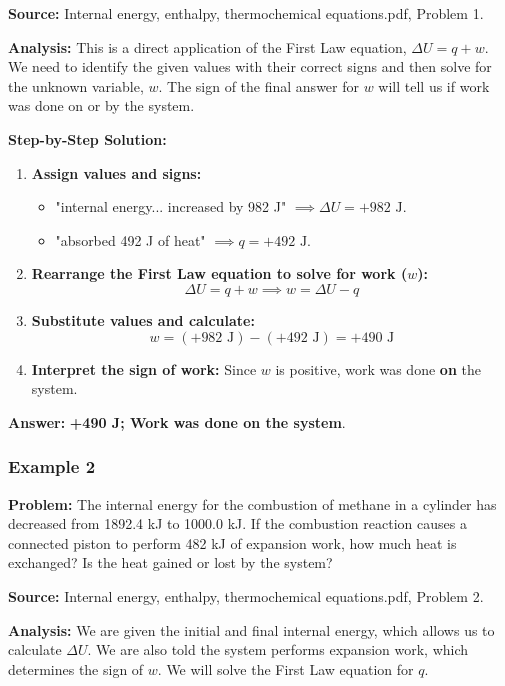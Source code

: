 \documentclass{article}
\begin{document}
\textbf{Source:} Internal energy, enthalpy, thermochemical equations.pdf, Problem 1.

\textbf{Analysis:} This is a direct application of the First Law equation, $\Delta U = q + w$. We need to identify the given values with their correct signs and then solve for the unknown variable, $w$. The sign of the final answer for $w$ will tell us if work was done on or by the system.

\textbf{Step-by-Step Solution:}
\begin{enumerate}
    \item \textbf{Assign values and signs:}
    \begin{itemize}
        \item "internal energy... increased by 982 J" $\implies \Delta U = +982 \text{ J}$.
        \item "absorbed 492 J of heat" $\implies q = +492 \text{ J}$.
    \end{itemize}
    \item \textbf{Rearrange the First Law equation to solve for work ($w$):}
    \[ \Delta U = q + w \implies w = \Delta U - q \]
    \item \textbf{Substitute values and calculate:}
    \[ w = (+982 \text{ J}) - (+492 \text{ J}) = +490 \text{ J} \]
    \item \textbf{Interpret the sign of work:} Since $w$ is positive, work was done \textbf{on} the system.
\end{enumerate}

\textbf{Answer:} \textbf{+490 J; Work was done on the system}.

\subsubsection{Example 2}
\textbf{Problem:} The internal energy for the combustion of methane in a cylinder has decreased from 1892.4 kJ to 1000.0 kJ. If the combustion reaction causes a connected piston to perform 482 kJ of expansion work, how much heat is exchanged? Is the heat gained or lost by the system?

\textbf{Source:} Internal energy, enthalpy, thermochemical equations.pdf, Problem 2.

\textbf{Analysis:} We are given the initial and final internal energy, which allows us to calculate $\Delta U$. We are also told the system performs expansion work, which determines the sign of $w$. We will solve the First Law equation for $q$.
\end{document}
